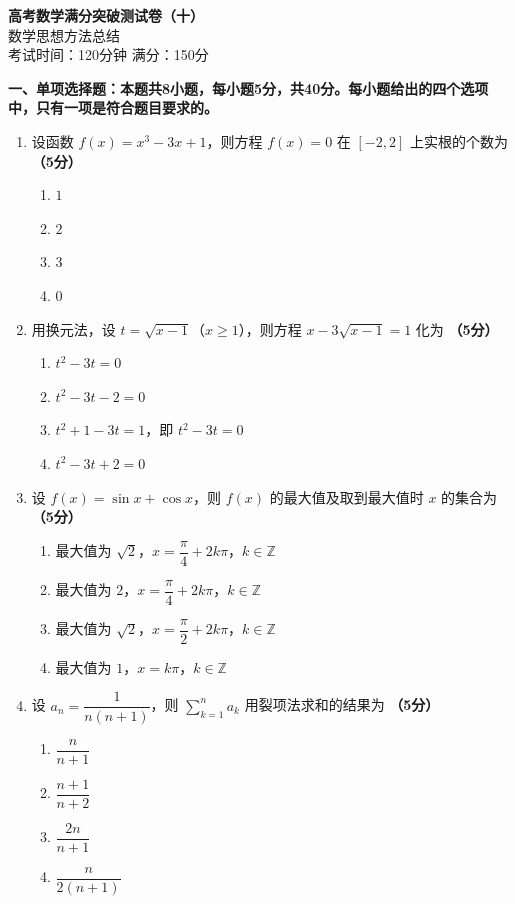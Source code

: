 \documentclass[12pt, a4paper]{ctexart}
\newcommand{\score}[1]{\hfill\textbf{（#1分）}}
\begin{document}
\begin{center}
{\LARGE\bfseries 高考数学满分突破测试卷（十）}\\[8pt]
{\large 数学思想方法总结}\\[6pt]
考试时间：120分钟 \quad 满分：150分
\end{center}

\vspace{10pt}

{\large\bfseries 一、单项选择题：本题共8小题，每小题5分，共40分。每小题给出的四个选项中，只有一项是符合题目要求的。}

\vspace{8pt}

\begin{enumerate}

\item 设函数 $f(x)=x^3-3x+1$，则方程 $f(x)=0$ 在 $[-2,2]$ 上实根的个数为 \score{5}
\begin{enumerate}[label=\Alph*.]
    \item $1$
    \item $2$
    \item $3$
    \item $0$
\end{enumerate}

\item 用换元法，设 $t=\sqrt{x-1}$（$x\geq 1$），则方程 $x-3\sqrt{x-1}=1$ 化为 \score{5}
\begin{enumerate}[label=\Alph*.]
    \item $t^2-3t=0$
    \item $t^2-3t-2=0$
    \item $t^2+1-3t=1$，即 $t^2-3t=0$
    \item $t^2-3t+2=0$
\end{enumerate}

\item 设 $f(x)=\sin x+\cos x$，则 $f(x)$ 的最大值及取到最大值时 $x$ 的集合为 \score{5}
\begin{enumerate}[label=\Alph*.]
    \item 最大值为 $\sqrt{2}$，$x=\dfrac{\pi}{4}+2k\pi$，$k\in\mathbb{Z}$
    \item 最大值为 $2$，$x=\dfrac{\pi}{4}+2k\pi$，$k\in\mathbb{Z}$
    \item 最大值为 $\sqrt{2}$，$x=\dfrac{\pi}{2}+2k\pi$，$k\in\mathbb{Z}$
    \item 最大值为 $1$，$x=k\pi$，$k\in\mathbb{Z}$
\end{enumerate}

\item 设 $a_n=\dfrac{1}{n(n+1)}$，则 $\displaystyle\sum_{k=1}^{n}a_k$ 用裂项法求和的结果为 \score{5}
\begin{enumerate}[label=\Alph*.]
    \item $\dfrac{n}{n+1}$
    \item $\dfrac{n+1}{n+2}$
    \item $\dfrac{2n}{n+1}$
    \item $\dfrac{n}{2(n+1)}$
\end{enumerate}


\end{enumerate}
\end{document}
